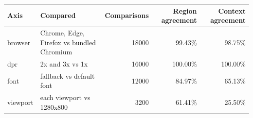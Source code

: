 \begin{tabular}{llrrr}
\hline Axis & Compared & Comparisons & Region agreement & Context agreement \\ \hline
browser & Chrome, Edge, Firefox vs bundled Chromium & 18000 & 99.43\% & 98.75\% \\
dpr & 2x and 3x vs 1x & 16000 & 100.00\% & 100.00\% \\
font & fallback vs default font & 12000 & 84.97\% & 65.13\% \\
viewport & each viewport vs 1280x800 & 3200 & 61.41\% & 25.50\% \\
\hline\end{tabular}
